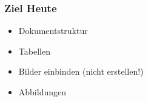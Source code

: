 
\subtitle{Abschnitte, Tabellen und Bilder}
\date{2017-05-16}



\begin{frame}
  \frametitle{Ziel Heute}

  \begin{itemize}
  \item Dokumentstruktur
  \item Tabellen
  \item Bilder einbinden (nicht erstellen!)
  \item Abbildungen
  \end{itemize}

\end{frame}

